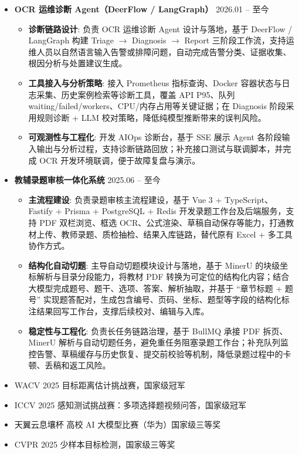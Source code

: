 \documentclass[zh]{resume}
\begin{document}
\begin{itemize}
  \item \textbf{OCR 运维诊断 Agent（DeerFlow / LangGraph）} \hfill 2026.01 -- 至今
  \begin{itemize}
    \item \textbf{诊断链路设计}: 负责 OCR 运维诊断 Agent 设计与落地，基于 DeerFlow / LangGraph 构建 Triage $\rightarrow$ Diagnosis $\rightarrow$ Report 三阶段工作流，支持运维人员以自然语言输入告警或排障问题，自动完成告警分类、证据收集、根因分析与处置建议生成。
    \item \textbf{工具接入与分析策略}: 接入 Prometheus 指标查询、Docker 容器状态与日志采集、历史案例检索等诊断工具，覆盖 API P95、队列 waiting/failed/workers、CPU/内存占用等关键证据；在 Diagnosis 阶段采用规则诊断 + LLM 校对策略，降低纯模型推断带来的误判风险。
    \item \textbf{可观测性与工程化}: 开发 AIOps 诊断台，基于 SSE 展示 Agent 各阶段输入输出与分析过程，支持诊断链路回放；补充接口测试与联调脚本，并完成 OCR 开发环境联调，便于故障复盘与演示。
  \end{itemize}

  \item \textbf{教辅录题审核一体化系统} \hfill 2025.06 -- 至今
  \begin{itemize}
    \item \textbf{主流程建设}: 负责录题审核主流程建设，基于 Vue 3 + TypeScript、Fastify + Prisma + PostgreSQL + Redis 开发录题工作台及后端服务，支持 PDF 双栏浏览、框选 OCR、公式渲染、草稿自动保存等能力，打通教材上传、教师录题、质检抽检、结果入库链路，替代原有 Excel + 多工具协作方式。
    \item \textbf{结构化自动切题}: 主导自动切题模块设计与落地，基于 MinerU 的块级坐标解析与目录分段能力，将教材 PDF 转换为可定位的结构化内容；结合大模型完成题号、题干、选项、答案、解析抽取，并基于 ``章节标题 + 题号'' 实现题答配对，生成包含编号、页码、坐标、题型等字段的结构化标注结果回写工作台，支撑后续校对、编辑与入库。
    \item \textbf{稳定性与工程化}: 负责长任务链路治理，基于 BullMQ 承接 PDF 拆页、MinerU 解析与自动切题任务，避免重任务阻塞录题工作台；补充队列监控告警、草稿缓存与历史恢复、提交前校验等机制，降低录题过程中的卡顿、丢稿和返工风险。
  \end{itemize}
\end{itemize}


\begin{itemize}
  \item WACV 2025 目标距离估计挑战赛，国家级冠军
  \item ICCV 2025 感知测试挑战赛：多项选择题视频问答，国家级冠军
  \item 天翼云息壤杯 高校 AI 大模型比赛（华为）国家级三等奖
  \item CVPR 2025 少样本目标检测，国家级三等奖
\end{itemize}
\end{document}
